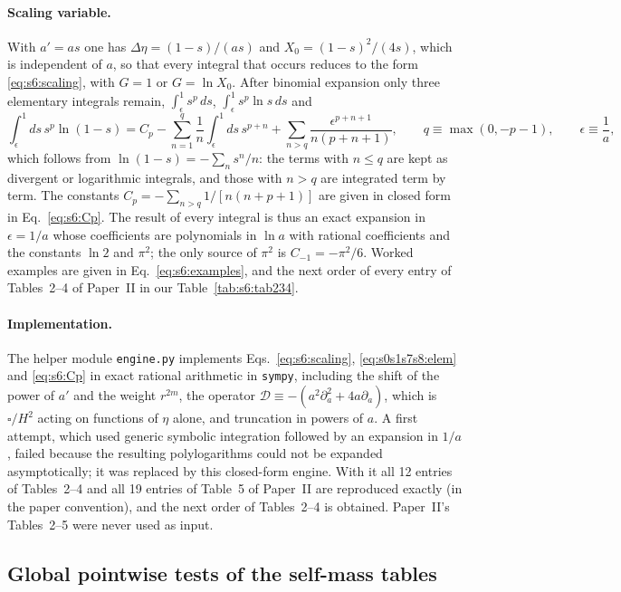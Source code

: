 \documentclass[aps,prd,onecolumn,10pt,nofootinbib,floatfix]{revtex4-2}
\newcommand{\Dop}{\mathcal{D}}
\begin{document}
\paragraph*{Scaling variable.} With $a'=as$ one has $\Delta\eta=(1-s)/(as)$ and $X_0=(1-s)^2/(4s)$, which is independent of $a$, so
that every integral that occurs reduces to the form \eqref{eq:s6:scaling}, with $G=1$ or $G=\ln X_0$. After binomial expansion
only three elementary integrals remain, $\int_\epsilon^1 s^p\,ds$, $\int_\epsilon^1 s^p\ln s\,ds$ and
\begin{equation}
\int_\epsilon^1\!ds\,s^p\ln(1-s)=C_p-\sum_{n=1}^{q}\frac1n\int_\epsilon^1\!ds\,s^{p+n}+\sum_{n>q}\frac{\epsilon^{p+n+1}}{n(p+n+1)},
\qquad q\equiv\max(0,-p-1),\qquad \epsilon\equiv\frac1a ,
\label{eq:s0s1s7s8:elem}
\end{equation}
which follows from $\ln(1-s)=-\sum_ns^n/n$: the terms with $n\le q$ are kept as divergent or logarithmic integrals, and those with
$n>q$ are integrated term by term. The constants $C_p=-\sum_{n>q}1/[n(n+p+1)]$ are given in closed form in Eq.~\eqref{eq:s6:Cp}.
The result of every integral is thus an exact expansion in $\epsilon=1/a$ whose coefficients are polynomials in $\ln a$ with
rational coefficients and the constants $\ln2$ and $\pi^2$; the only source of $\pi^2$ is $C_{-1}=-\pi^2/6$. Worked examples are
given in Eq.~\eqref{eq:s6:examples}, and the next order of every entry of Tables~2--4 of Paper~II in our
Table~\ref{tab:s6:tab234}.

\paragraph*{Implementation.} The helper module \texttt{engine.py} implements Eqs.~\eqref{eq:s6:scaling}, \eqref{eq:s0s1s7s8:elem} and \eqref{eq:s6:Cp} in
exact rational arithmetic in \texttt{sympy}, including the shift of the power of $a'$ and the weight $r^{2m}$, the operator
$\Dop\equiv-(a^2\partial_a^2+4a\partial_a)$, which is $\square/H^2$ acting on functions of $\eta$ alone, and truncation in powers of
$a$. A first attempt, which used generic symbolic integration followed by an expansion in $1/a$, failed because the resulting
polylogarithms could not be expanded asymptotically; it was replaced by this closed-form engine. With it all 12 entries of Tables~2--4
and all 19 entries of Table~5 of Paper~II are reproduced exactly (in the paper convention), and the next order of Tables~2--4 is
obtained. Paper~II's Tables~2--5 were never used as input.

\subsection{Global pointwise tests of the self-mass tables}
\label{app:s0s1s7s8:global}
\end{document}
